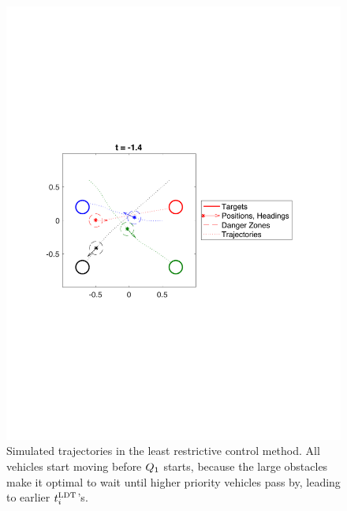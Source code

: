 \begin{figure}
  \centering
  \includegraphics[width=0.8\columnwidth]{fig/lrc_traj}
  \caption{Simulated trajectories in the least restrictive control method. All vehicles start moving before $Q_1$ starts, because the large obstacles make it optimal to wait until higher priority vehicles pass by, leading to earlier $t^\text{LDT}_i$'s. }
  \label{fig:lrc_traj}
\end{figure}

